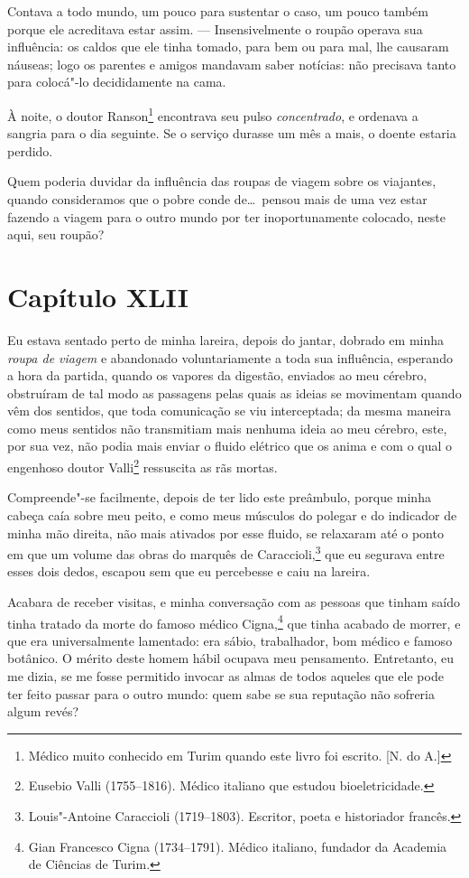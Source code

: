  Contava a todo mundo, um pouco para sustentar o caso, um pouco também
porque ele acreditava estar assim. --- Insensivelmente o roupão operava
sua influência: os caldos que ele tinha tomado, para bem ou para mal,
lhe causaram náuseas; logo os parentes e amigos mandavam saber
notícias: não precisava tanto para colocá"-lo decididamente na cama. 

 À noite, o doutor Ranson\footnote{ Médico muito conhecido em Turim
quando este livro foi escrito. [N. do A.]} encontrava seu pulso
\textit{concentrado}, e ordenava a sangria para o dia seguinte. Se o
serviço durasse um mês a mais, o doente estaria perdido.

 Quem poderia duvidar da influência das roupas de viagem sobre os
viajantes, quando consideramos que o pobre conde de\ldots\ pensou mais de
uma vez estar fazendo a viagem para o outro mundo por ter
inoportunamente colocado, neste aqui, seu roupão?

\section*{Capítulo XLII}

 Eu estava sentado perto de minha lareira, depois do jantar, dobrado em
minha \textit{roupa de viagem} e abandonado voluntariamente a toda sua
influência, esperando a hora da partida, quando os vapores da digestão,
enviados ao meu cérebro, obstruíram de tal modo as passagens pelas
quais as ideias se movimentam quando vêm dos sentidos, que toda
comunicação se viu interceptada; da mesma maneira como meus sentidos
não transmitiam mais nenhuma ideia ao meu cérebro, este, por sua vez,
não podia mais enviar o fluido elétrico que os anima e com o qual o
engenhoso doutor Valli\footnote{ Eusebio Valli (1755--1816). Médico
italiano que estudou bioeletricidade.} ressuscita as rãs mortas. 

Compreende"-se facilmente, depois de ter lido este preâmbulo, porque
minha cabeça caía sobre meu peito, e como meus músculos do polegar e do
indicador de minha mão direita, não mais ativados por esse fluido, se
relaxaram até o ponto em que um volume das obras do marquês de
Caraccioli,\footnote{ Louis"-Antoine Caraccioli (1719--1803). Escritor,
poeta e historiador francês.} que eu segurava entre esses dois
dedos, escapou sem que eu percebesse e caiu na lareira. 

Acabara de receber visitas, e minha conversação com as pessoas que
tinham saído tinha tratado da morte do famoso médico Cigna,\footnote{ Gian 
Francesco Cigna (1734--1791). Médico italiano, fundador da Academia
de Ciências de Turim.} que tinha acabado de morrer, e que era
universalmente lamentado: era sábio, trabalhador, bom médico e famoso
botânico. O mérito deste homem hábil ocupava meu pensamento.
Entretanto, eu me dizia, se me fosse permitido invocar as almas de
todos aqueles que ele pode ter feito passar para o outro mundo: quem
sabe se sua reputação não sofreria algum revés?

